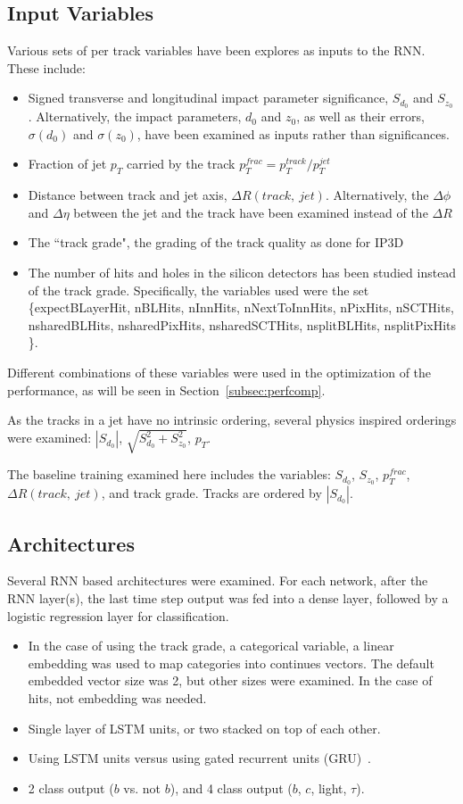 \subsection{Input Variables} \label{subsec:vars}
Various sets of per track variables have been explores as inputs to the RNN. These include:
\begin{itemize}
\item Signed transverse and longitudinal impact parameter significance, $S_{d_0}$ and $S_{z_0}$.  Alternatively, the impact parameters, $d_0$ and $z_0$, as well as their errors,  $\sigma(d_0)$ and $\sigma(z_0)$, have been examined as inputs rather than significances.
\item Fraction of jet $p_T$ carried by the track $p_T^{frac} = p_T^{track} / p_T^{jet}$
\item Distance between track and jet axis, $\Delta R(track,\ jet)$. Alternatively, the $\Delta \phi$ and $\Delta \eta$ between the jet and the track have been examined instead of the $\Delta R$
\item The ``track grade", the grading of the track quality as done for IP3D~\cite{IP3D}
\item The number of hits and holes in the silicon detectors has been studied instead of the track grade. Specifically, the variables used were the set \{expectBLayerHit, nBLHits, nInnHits, nNextToInnHits, nPixHits, nSCTHits, nsharedBLHits, nsharedPixHits, nsharedSCTHits, nsplitBLHits, nsplitPixHits \}.
\end{itemize}
Different combinations of these variables were used in the optimization of the performance, as will be seen in Section~\ref{subsec:perfcomp}.

As the tracks in a jet have no intrinsic ordering, several physics inspired orderings were examined: $|S_{d_0}|$, $\sqrt{S_{d_0}^2 + S_{z_0}^2}$, $p_T$.

The baseline training examined here includes the variables: $S_{d_0}$, $S_{z_0}$, $p_T^{frac}$, $\Delta R(track,\ jet)$, and track grade. Tracks are ordered by $|S_{d_0}|$.


\subsection{Architectures} \label{subsec:arch}
Several RNN based architectures were examined. For each network, after the RNN layer(s), the last time step output was fed into a dense layer, followed by a logistic regression layer for classification.
\begin{itemize}
\item In the case of using the track grade, a categorical variable, a linear embedding was used to map categories into continues vectors.  The default embedded vector size was 2, but other sizes were examined. In the case of hits, not embedding was needed.
\item Single layer of LSTM units, or two stacked on top of each other.
\item Using LSTM units versus using gated recurrent units (GRU)~\cite{GRU}.
\item 2 class output ($b$ vs. not $b$), and 4 class output ($b$, $c$, light, $\tau$).
\end{itemize}


